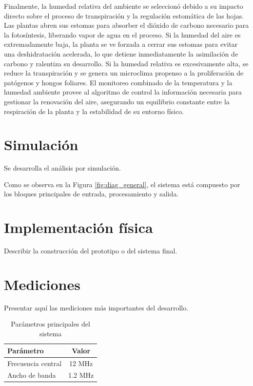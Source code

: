 Finalmente, la humedad relativa del ambiente se seleccionó debido a su impacto directo sobre el proceso de transpiración y la regulación estomática de las hojas. Las plantas abren sus estomas para absorber el dióxido de carbono necesario para la fotosíntesis, liberando vapor de agua en el proceso. Si la humedad del aire es extremadamente baja, la planta se ve forzada a cerrar sus estomas para evitar una deshidratación acelerada, lo que detiene inmediatamente la asimilación de carbono y ralentiza su desarrollo. Si la humedad relativa es excesivamente alta, se reduce la transpiración y se genera un microclima propenso a la proliferación de patógenos y hongos foliares. El monitoreo combinado de la temperatura y la humedad ambiente provee al algoritmo de control la información necesaria para gestionar la renovación del aire, asegurando un equilibrio constante entre la respiración de la planta y la estabilidad de su entorno físico.

\section{Simulación}
Se desarrolla el análisis por simulación.


Como se observa en la Figura \ref{fig:diag_general}, el sistema está compuesto por los bloques principales de entrada, procesamiento y salida.

\section{Implementación física}
Describir la construcción del prototipo o del sistema final.

\section{Mediciones}
Presentar aquí las mediciones más importantes del desarrollo.

\begin{table}[H]
    \centering
    \begin{tabular}{lc}
        \toprule
        Parámetro & Valor \\
        \midrule
        Frecuencia central & 12 MHz \\
        Ancho de banda & 1.2 MHz \\
        \bottomrule
    \end{tabular}
    \caption{Parámetros principales del sistema}
    \label{tab:parametros}
\end{table}



